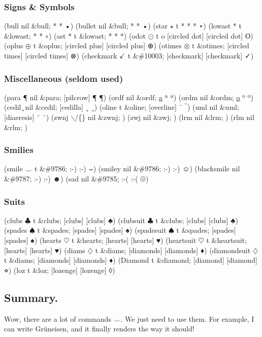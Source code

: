 \documentclass[11pt]{article}
\begin{document}
\subsubsection{Signs \& Symbols}
\label{sec-1-3-8}
(bull \textbullet{} nil \&bull; * * •)
(bullet \textbullet{} nil \&bull; * * •)
(star $\star$ t * * * ⋆)
(lowast $\ast$ t \&lowast; * * ∗)
(ast $\ast$ t \&lowast; * * *)
(odot $\odot$ t o [circled dot] [circled dot] ʘ)
(oplus $\oplus$ t \&oplus; [circled plus] [circled plus] ⊕)
(otimes $\otimes$ t \&otimes; [circled times] [circled times] ⊗)
(checkmark $\checkmark$ t \&\#10003; [checkmark] [checkmark] ✓)

\subsubsection{Miscellaneous (seldom used)}
\label{sec-1-3-9}
(para \P{} nil \&para; [pilcrow] ¶ ¶)
(ordf \textordfeminine{} nil \&ordf; \uline{a} ª ª)
(ordm \textordmasculine{} nil \&ordm; \uline{o} º º)
(cedil \c{} nil \&cedil; [cedilla] ¸ ¸)
(oline \overline{~} t \&oline; [overline] ¯ ‾)
(uml \textasciidieresis{} nil \&uml; [diaeresis] ¨ ¨)
(zwnj $\backslash$/\{\} nil \&zwnj;   ‌)
(zwj  nil \&zwj;   ‍)
(lrm  nil \&lrm;   ‎)
(rlm  nil \&rlm;   ‏)

\subsubsection{Smilies}
\label{sec-1-3-10}
(smile $\smile$ t \&\#9786; :-) :-) ⌣)
(smiley \smiley{} nil \&\#9786; :-) :-) ☺)
(blacksmile \blacksmiley{} nil \&\#9787; :-) :-) ☻)
(sad \frownie{} nil \&\#9785; :-( :-( ☹)

\subsubsection{Suits}
\label{sec-1-3-11}
(clubs $\clubsuit$ t \&clubs; [clubs] [clubs] ♣)
(clubsuit $\clubsuit$ t \&clubs; [clubs] [clubs] ♣)
(spades $\spadesuit$ t \&spades; [spades] [spades] ♠)
(spadesuit $\spadesuit$ t \&spades; [spades] [spades] ♠)
(hearts $\heartsuit$ t \&hearts; [hearts] [hearts] ♥)
(heartsuit $\heartsuit$ t \&heartsuit; [hearts] [hearts] ♥)
(diams $\diamondsuit$ t \&diams; [diamonds] [diamonds] ♦)
(diamondsuit $\diamondsuit$ t \&diams; [diamonds] [diamonds] ♦)
(Diamond \diamond t \&diamond; [diamond] [diamond] ⋄)
(loz \diamond t \&loz; [lozenge] [lozenge] ◊)
\subsection{Summary.}
\label{sec-1-4}
Wow, there are a lot of commands $\smile$. We just need to use them. For example, I can write Gr\"{u}neisen, and it finally renders the way it should!
\end{document}
